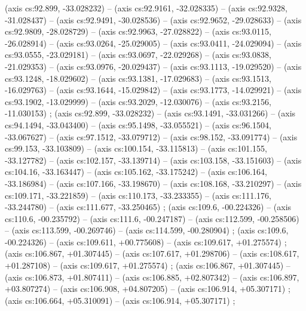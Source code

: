     (axis cs:92.899,    -33.028232) --  (axis cs:92.9161,    -32.028335) --  (axis cs:92.9328,    -31.028437) --  (axis cs:92.9491,    -30.028536) --  (axis cs:92.9652,    -29.028633) --  (axis cs:92.9809,    -28.028729) --  (axis cs:92.9963,    -27.028822) --  (axis cs:93.0115,    -26.028914) --  (axis cs:93.0264,    -25.029005) --  (axis cs:93.0411,    -24.029094) --  (axis cs:93.0555,    -23.029181) --  (axis cs:93.0697,    -22.029268) --  (axis cs:93.0838,    -21.029353) --  (axis cs:93.0976,    -20.029437) --  (axis cs:93.1113,    -19.029520) --  (axis cs:93.1248,    -18.029602) --  (axis cs:93.1381,    -17.029683) --  (axis cs:93.1513,    -16.029763) --  (axis cs:93.1644,    -15.029842) --  (axis cs:93.1773,    -14.029921) --  (axis cs:93.1902,    -13.029999) --  (axis cs:93.2029,    -12.030076) --  (axis cs:93.2156,    -11.030153) ;
    (axis cs:92.899,    -33.028232) --  (axis cs:93.1491,    -33.031266) --  (axis cs:94.1494,    -33.043400) --  (axis cs:95.1498,    -33.055521) --  (axis cs:96.1504,    -33.067627) --  (axis cs:97.1512,    -33.079712) --  (axis cs:98.152,    -33.091774) --  (axis cs:99.153,    -33.103809) --  (axis cs:100.154,    -33.115813) --  (axis cs:101.155,    -33.127782) --  (axis cs:102.157,    -33.139714) --  (axis cs:103.158,    -33.151603) --  (axis cs:104.16,    -33.163447) --  (axis cs:105.162,    -33.175242) --  (axis cs:106.164,    -33.186984) --  (axis cs:107.166,    -33.198670) --  (axis cs:108.168,    -33.210297) --  (axis cs:109.171,    -33.221859) --  (axis cs:110.173,    -33.233355) --  (axis cs:111.176,    -33.244780) --  (axis cs:111.677,    -33.250465) ;
    (axis cs:109.6,    -00.224326) --  (axis cs:110.6,    -00.235792) --  (axis cs:111.6,    -00.247187) --  (axis cs:112.599,    -00.258506) --  (axis cs:113.599,    -00.269746) --  (axis cs:114.599,    -00.280904) ;
    (axis cs:109.6,    -00.224326) --  (axis cs:109.611,    +00.775608) --  (axis cs:109.617,    +01.275574) ;
    (axis cs:106.867,    +01.307445) --  (axis cs:107.617,    +01.298706) --  (axis cs:108.617,    +01.287108) --  (axis cs:109.617,    +01.275574) ;
    (axis cs:106.867,    +01.307445) --  (axis cs:106.873,    +01.807411) --  (axis cs:106.885,    +02.807342) --  (axis cs:106.897,    +03.807274) --  (axis cs:106.908,    +04.807205) --  (axis cs:106.914,    +05.307171) ;
    (axis cs:106.664,    +05.310091) --  (axis cs:106.914,    +05.307171) ;
